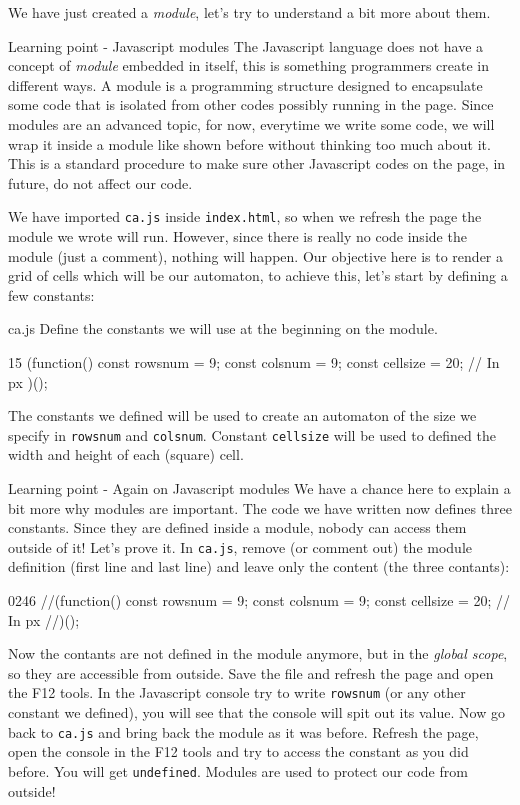 We have just created a \textit{module}, let's try to understand a bit more about them.

\begin{tips}{Learning point - Javascript modules}
The Javascript language does not have a concept of \textit{module} embedded in itself,
this is something programmers create in
different ways. A module is a programming structure designed to encapsulate some code that is isolated
from other codes possibly running in the page.
Since modules are an advanced topic, for now, everytime
we write some code, we will wrap it inside a module like shown before without thinking too much about it.
This is a standard procedure to make sure other Javascript codes on the page, in future, do not
affect our code.
\end{tips}

We have imported \texttt{ca.js} inside \texttt{index.html}, so when we refresh the page the module
we wrote will run. However, since there is really no code inside the module (just a comment),
nothing will happen. Our objective here is to render a grid of cells which will be our automaton,
to achieve this, let's start by defining a few constants:

\begin{programcode}{ca.js}
Define the constants we will use at the beginning on the module.
\begin{codeh1}{1}{5}
(function(){
  const rowsnum = 9;
  const colsnum = 9;
  const cellsize = 20; // In px
})();
\end{codeh1}
\end{programcode}

The constants we defined will be used to create an automaton of the size we specify in 
\texttt{rowsnum} and \texttt{colsnum}. Constant \texttt{cellsize} will be used to defined the
width and height of each (square) cell.

\begin{tips}{Learning point - Again on Javascript modules}
We have a chance here to explain a bit more why modules are important. The code we have written
now defines three constants. Since they are defined inside a module, nobody can access them outside
of it! Let's prove it. In \texttt{ca.js}, remove (or comment out) the
module definition (first line and last line) and
leave only the content (the three contants):
\begin{codeh2}{0}{2}{4}{6}
//(function(){
  const rowsnum = 9;
  const colsnum = 9;
  const cellsize = 20; // In px
//})();
\end{codeh2}
Now the contants are not defined in the module anymore,
but in the \textit{global scope}, so they are accessible from outside.
Save the file and refresh the page and open the F12 tools. In the Javascript console try to
write \texttt{rowsnum} (or any other constant we defined), you will see that the console will spit
out its value.
Now go back to \texttt{ca.js} and bring back the module as it was before. Refresh the page, open the
console in the F12 tools and try to access the constant as you did before. You will get 
\texttt{undefined}. Modules are used to protect our code from outside!
\end{tips}

